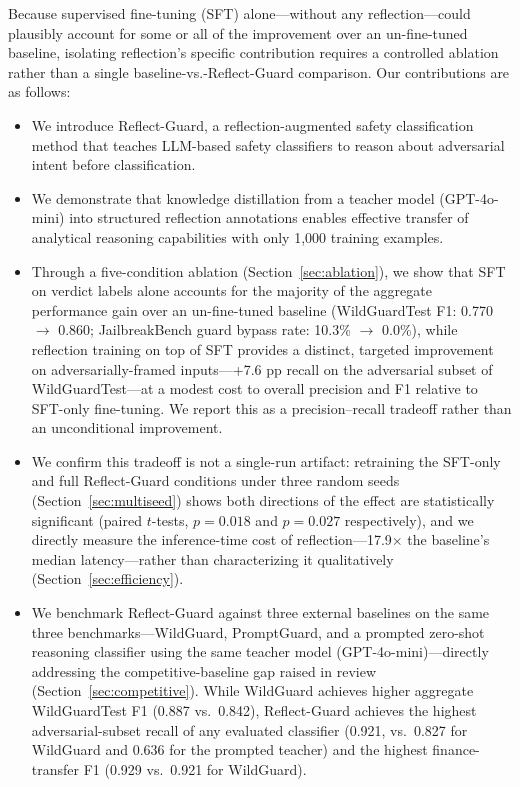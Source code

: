 \documentclass[Superintelligence,article,submit,pdftex,moreauthors]{Definitions/mdpi}
\begin{document}
Because supervised fine-tuning (SFT) alone---without any reflection---could plausibly account for some or all of the improvement over an un-fine-tuned baseline, isolating reflection's specific contribution requires a controlled ablation rather than a single baseline-vs.-Reflect-Guard comparison. Our contributions are as follows:
\begin{itemize}[leftmargin=*, nosep]
  \item We introduce Reflect-Guard, a reflection-augmented safety classification method that teaches LLM-based safety classifiers to reason about adversarial intent before classification.
  \item We demonstrate that knowledge distillation from a teacher model (GPT-4o-mini) into structured reflection annotations enables effective transfer of analytical reasoning capabilities with only 1{,}000 training examples.
  \item Through a five-condition ablation (Section~\ref{sec:ablation}), we show that SFT on verdict labels alone accounts for the majority of the aggregate performance gain over an un-fine-tuned baseline (WildGuardTest F1: 0.770 $\to$ 0.860; JailbreakBench guard bypass rate: 10.3\% $\to$ 0.0\%), while reflection training on top of SFT provides a distinct, targeted improvement on adversarially-framed inputs---+7.6 pp recall on the adversarial subset of WildGuardTest---at a modest cost to overall precision and F1 relative to SFT-only fine-tuning. We report this as a precision--recall tradeoff rather than an unconditional improvement.
  \item We confirm this tradeoff is not a single-run artifact: retraining the SFT-only and full Reflect-Guard conditions under three random seeds (Section~\ref{sec:multiseed}) shows both directions of the effect are statistically significant (paired $t$-tests, $p=0.018$ and $p=0.027$ respectively), and we directly measure the inference-time cost of reflection---17.9$\times$ the baseline's median latency---rather than characterizing it qualitatively (Section~\ref{sec:efficiency}).
  \item We benchmark Reflect-Guard against three external baselines on the same three benchmarks---WildGuard, PromptGuard, and a prompted zero-shot reasoning classifier using the same teacher model (GPT-4o-mini)---directly addressing the competitive-baseline gap raised in review (Section~\ref{sec:competitive}). While WildGuard achieves higher aggregate WildGuardTest F1 (0.887 vs.\ 0.842), Reflect-Guard achieves the highest adversarial-subset recall of any evaluated classifier (0.921, vs.\ 0.827 for WildGuard and 0.636 for the prompted teacher) and the highest finance-transfer F1 (0.929 vs.\ 0.921 for WildGuard).
\end{itemize}
\end{document}
